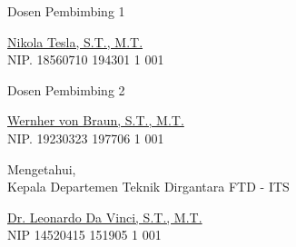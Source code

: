 \begin{center}

  \begin{multicols}{2}

    Dosen Pembimbing 1
    \vspace{12ex}

    \underline{Nikola Tesla, S.T., M.T.} \\
    NIP. 18560710 194301 1 001

    \columnbreak

    Dosen Pembimbing 2
    \vspace{12ex}

    \underline{Wernher von Braun, S.T., M.T.} \\
    NIP. 19230323 197706 1 001

  \end{multicols}
  \vspace{6ex}

  Mengetahui, \\
  Kepala Departemen Teknik Dirgantara FTD - ITS
  \vspace{12ex}

  \underline{Dr. Leonardo Da Vinci, S.T., M.T.} \\
  NIP 14520415 151905 1 001

\end{center}
